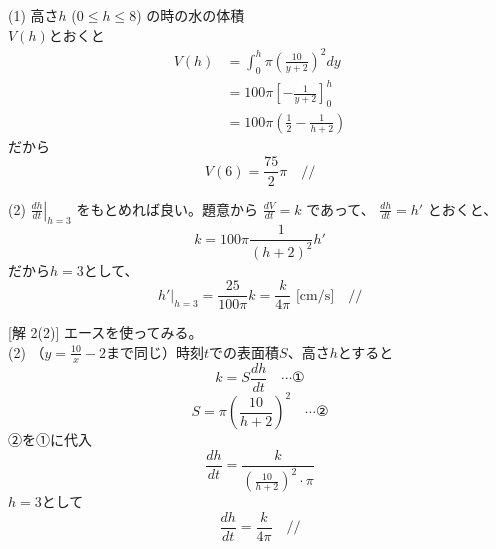 \documentclass[../main.tex]{subfiles}
\begin{document}
\begin{center}
\end{center}

(1) 高さ$h$ ($0 \le h \le 8$) の時の水の体積\\
$V(h)$とおくと
\begin{align*}
  V(h) &= \int_0^h \pi \left( \frac{10}{y+2} \right)^2 dy \\
  &= 100\pi \left[ -\frac{1}{y+2} \right]_0^h \\
  &= 100\pi \left( \frac{1}{2} - \frac{1}{h+2} \right)
\end{align*}
だから
\[ V(6) = \frac{75}{2}\pi \quad // \]

(2) $\left. \frac{dh}{dt} \right|_{h=3}$ をもとめれば良い。題意から $\frac{dV}{dt} = k$ であって、
$\frac{dh}{dt} = h'$ とおくと、
\[ k = 100\pi \frac{1}{(h+2)^2} h' \]
だから$h=3$として、
\[ \left. h' \right|_{h=3} = \frac{25}{100\pi}k = \frac{k}{4\pi} \text{ [cm/s]} \quad // \]

\vspace{1cm}
[解 2(2)] エースを使ってみる。\\
(2) （$y = \frac{10}{x} - 2$まで同じ）時刻$t$での表面積$S$、高さ$h$とすると
\[ k = S \frac{dh}{dt} \quad \cdots \text{①} \]
\[ S = \pi \left(\frac{10}{h+2}\right)^2 \quad \cdots \text{②} \]
②を①に代入
\[ \frac{dh}{dt} = \frac{k}{\left(\frac{10}{h+2}\right)^2 \cdot \pi} \]
$h=3$として
\[ \frac{dh}{dt} = \frac{k}{4\pi} \quad // \]

{\color{cyan}
}
\end{document}
